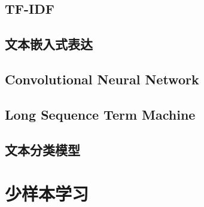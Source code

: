 \subsection{TF-IDF}
\subsection{文本嵌入式表达}
\subsection{Convolutional Neural Network}
\subsection{Long Sequence Term Machine}
\subsection{文本分类模型}

\section{少样本学习}


